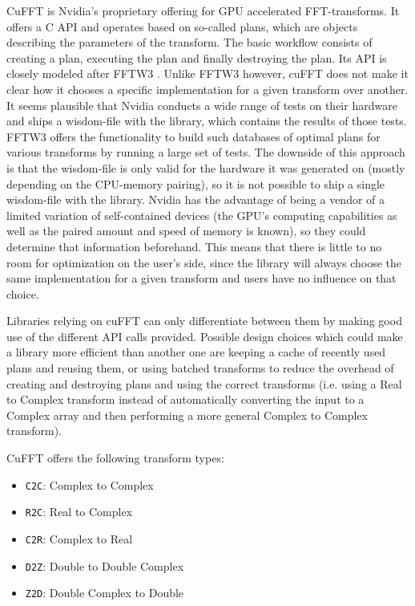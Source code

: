 \documentclass[english,11pt,a4paper,table]{article} %
\begin{document}
CuFFT \cite{cuFFTNVI56:online} is Nvidia's proprietary offering for GPU accelerated FFT-transforms.
It offers a C API and operates based on so-called plans, which are objects describing the parameters of the transform.
The basic workflow consists of creating a plan, executing the plan and finally destroying the plan.
Its API is closely modeled after FFTW3 \cite{FFTW3}.
Unlike FFTW3 however, cuFFT does not make it clear how it chooses a specific implementation for a given transform over another.
It seems plausible that Nvidia conducts a wide range of tests on their hardware and ships a wisdom-file with the library, which contains the results of those tests. FFTW3 offers the functionality to build such databases of optimal plans for various transforms by running a large set of tests.
The downside of this approach is that the wisdom-file is only valid for the hardware it was generated on (mostly depending on the CPU-memory pairing), so it is not possible to ship a single wisdom-file with the library.
Nvidia has the advantage of being a vendor of a limited variation of self-contained devices (the GPU's computing capabilities as well as the paired amount and speed of memory is known), so they could determine that information beforehand.
This means that there is little to no room for optimization on the user's side, since the library will always choose the same implementation for a given transform and users have no influence on that choice.

Libraries relying on cuFFT can only differentiate between them by making good use of the different API calls provided.
Possible design choices which could make a library more efficient than another one are keeping a cache of recently used plans and reusing them, or using batched transforms to reduce the overhead of creating and destroying plans and using the correct transforms (i.e. using a Real to Complex transform instead of automatically converting the input to a Complex array and then performing a more general Complex to Complex transform).

CuFFT offers the following transform types:
\begin{itemize}
	\item \texttt{C2C}: Complex to Complex
	\item \texttt{R2C}: Real to Complex
	\item \texttt{C2R}: Complex to Real
	\item \texttt{D2Z}: Double to Double Complex
	\item \texttt{Z2D}: Double Complex to Double
\end{itemize}
\end{document}
